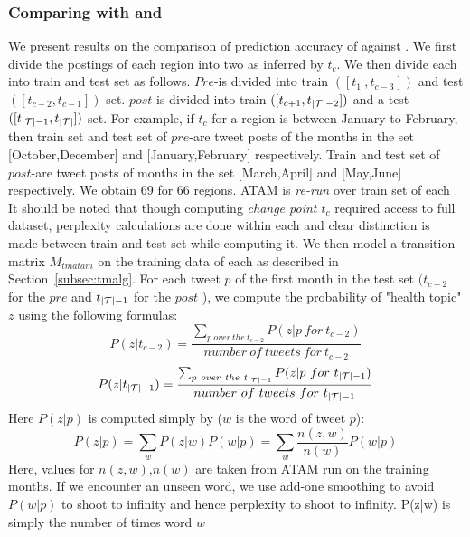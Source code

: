 \subsubsection{Comparing \tmatam with \tmlda and \atam}
We present results on the comparison of prediction accuracy of \tmatam
against \tmlda. We first divide the postings of each region into two 
\changes as inferred by $t_{c}$. We then divide each \change into train and test set as follows.
$Pre$-\change is divided into  train $([t_1\ ,t_{c-3}])$ and test $([t_{c-2},t_{c-1}])$ set. $post$-\change is divided into
train $([t_{c+1},t_{|\mathcal{T}|-2}])$ and a test $([t_{|\mathcal{T}|-1},t_{|\mathcal{T}|}])$ set. For example, if $t_c$ for a region is between January to February, then train set and test set of $pre$-\change are tweet posts of the months in the set [October,December] and [January,February] respectively. Train and test set of $post$-\change are tweet posts of months in the set [March,April] and  [May,June] respectively.
 We obtain 69 \changes for 66 regions. ATAM is \textit{re-run} over train set of each \change. It should be noted that though computing \textit{change point $t_c$} required access to full dataset, perplexity calculations are done within each \change and clear distinction is made between train and test set while computing it.  We then model a transition matrix 
$M_{tmatam}$ on the training data of each \change as described in Section~\ref{subsec:tmalg}. 
For each tweet $p$ of the first month in the test set $(t_{c-2}$ for the $pre$ \change and $t_{|\mathcal{T}|-1}$ for the $post$ \change), 
we compute the probability of "health topic" $z$ using the following formulas: \\
\begin{equation}
\label{eq:probabilitytopicgiventimepre}
P(z|t_{c-2}) = \frac{\sum_{p\ over\ the\ t_{c-2}}P(z|p\ for\ t_{c-2} )}
    {number\ of\ tweets\ for\ t_{c-2}}
\end{equation}
\begin{equation}
\label{eq:probabilitytopicgiventimepost}
P(z|t_{|\mf T|-1}) = \frac{\sum_{p\ over\ the\ t_{|\mf T|-1}}P(z|p\ for\ t_{|\mf T|-1} )}
    {number\ of\ tweets\ for\ t_{|\mf T|-1}}
\end{equation}
 Here $P(z|p)$ is computed simply by ($w$ is the word of tweet $p$): \\
\begin{equation}
\label{eq:probabilitytopicgiventweet}
 P(z|p)=\sum_{w}P(z|w)P(w|p) = \sum_{w}\frac{n(z,w)}{n(w)}P(w|p)
\end{equation}
Here, values for $n(z,w)$,$n(w)$ are taken from ATAM run on the training months. If we encounter an unseen word, we use add-one smoothing to avoid $P(w|p)$  to shoot to infinity and hence perplexity to shoot to infinity. P(z|w) is simply the number of times word $w$
